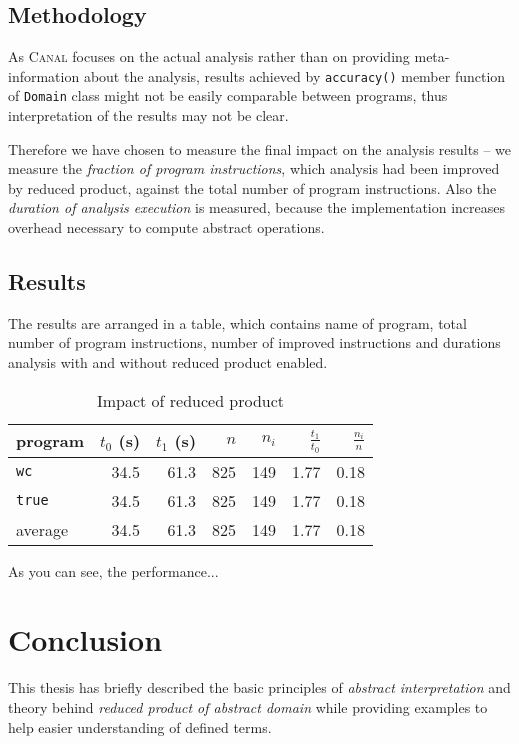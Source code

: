 \documentclass[12pt,oneside]{fithesis2}
\theoremstyle{definition}
\begin{document}
\section{Methodology}

As \textsc{Canal} focuses on the actual analysis rather than on providing meta-information about the analysis, results achieved by \texttt{accuracy()} member function of \texttt{Domain} class might not be easily comparable between programs, thus interpretation of the results may not be clear.

Therefore we have chosen to measure the final impact on the analysis results -- we measure the \textit{fraction of program instructions}, which analysis had been improved by reduced product, against the total number of program instructions. Also the \textit{duration of analysis execution} is measured, because the implementation increases overhead necessary to compute abstract operations.

\section{Results}

The results are arranged in a table, which contains name of program, total number of program instructions, number of improved instructions and durations analysis with and without reduced product enabled.

\begin{table}[ht!]
  \footnotesize
  \centering
  \begin{tabular}{l rrrr rr}
    program & $t_0$ (s) & $t_1$ (s) & $n$ & $n_i$ & $\frac{t_1}{t_0}$ & $\frac{n_i}{n}$ \\
    \midrule
    \texttt{wc} & 34.5 & 61.3 & 825 & 149 & 1.77 &  0.18 \\
    \texttt{true} & 34.5 & 61.3 & 825 & 149 & 1.77 &  0.18 \\
    \midrule
    average & 34.5 & 61.3 & 825 & 149 & 1.77 &  0.18 \\
  \end{tabular}
  \caption{Impact of reduced product}
\end{table}

As you can see, the performance...

\chapter{Conclusion}

This thesis has briefly described the basic principles of \textit{abstract interpretation} and theory behind \textit{reduced product of abstract domain} while providing examples to help easier understanding of defined terms.
\end{document}
